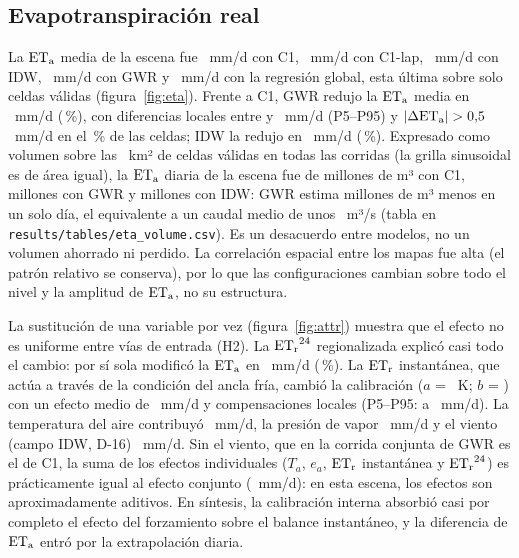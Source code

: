 \subsection{Evapotranspiración real}\label{sec:res-eta}

La $\mathrm{ET_a}$ media de la escena fue \MEtaCOneMean~mm/d con C1,
\MEtaCOneLapMean~mm/d con C1-lap, \MEtaCTwoIDWMean~mm/d con IDW,
\MEtaCThreeGWRMean~mm/d con GWR y \MEtaCTwoOLSMean~mm/d con la regresión
global, esta última sobre solo \OLSValidCells{} celdas
válidas (figura~\ref{fig:eta}). Frente a C1, GWR redujo la $\mathrm{ET_a}$ media en
\DEtaCThreeGWRMean~mm/d (\DEtaCThreeGWRPct\,\%), con diferencias locales
entre \DEtaCThreeGWRLo{} y \DEtaCThreeGWRHi~mm/d (P5--P95) y
$|\Delta\mathrm{ET_a}| > 0{,}5$~mm/d en el \DEtaCThreeGWRShare\,\% de las celdas; IDW la
redujo en \DEtaCTwoIDWMean~mm/d (\DEtaCTwoIDWPct\,\%). Expresado como volumen sobre las
\VolArea~km² de celdas válidas en todas las corridas (la grilla sinusoidal es de
área igual), la $\mathrm{ET_a}$ diaria de la escena fue de \VolCOne{} millones de m³ con
C1, \VolCThreeGWR{} millones con GWR y \VolCTwoIDW{} millones con IDW: GWR estima
\VolDiffAbsCThreeGWR{} millones de m³ menos en un solo día, el equivalente a un
caudal medio de unos \VolDiffFlowCThreeGWR~m³/s (tabla en
\texttt{results/tables/eta\_volume.csv}). Es un desacuerdo entre modelos, no un
volumen ahorrado ni perdido. La correlación espacial
entre los mapas fue alta (el patrón relativo se conserva), por lo que las
configuraciones cambian sobre todo el nivel y la amplitud de $\mathrm{ET_a}$, no su
estructura.

La sustitución de una variable por vez (figura~\ref{fig:attr}) muestra que
el efecto no es uniforme entre vías de entrada (H2). La $\mathrm{ET_r}^{24}$
regionalizada explicó casi todo el cambio: por sí sola modificó la $\mathrm{ET_a}$
en \DEtaOatEtrDayMean~mm/d (\DEtaOatEtrDayPct\,\%). La $\mathrm{ET_r}$ instantánea,
que actúa a través de la condición del ancla fría, cambió la calibración
($a$ = \CalOatEtrInstA~K; $b$ = \CalOatEtrInstB) con un efecto medio de
\DEtaOatEtrInstMean~mm/d y compensaciones locales (P5--P95:
\DEtaOatEtrInstLo{} a \DEtaOatEtrInstHi~mm/d). La temperatura del aire
contribuyó \DEtaOatTaMean~mm/d, la presión de vapor \DEtaOatEaMean~mm/d y el
viento (campo IDW, D-16) \DEtaOatWindMean~mm/d. Sin el viento, que en la
corrida conjunta de GWR es el de C1, la suma de los efectos individuales
($T_a$, $e_a$, $\mathrm{ET_r}$ instantánea y $\mathrm{ET_r}^{24}$) es prácticamente igual al
efecto conjunto (\DEtaCThreeGWRMean~mm/d): en esta escena, los efectos son
aproximadamente aditivos. En síntesis, la calibración interna absorbió casi
por completo el efecto del forzamiento sobre el balance instantáneo, y la
diferencia de $\mathrm{ET_a}$ entró por la extrapolación diaria.

